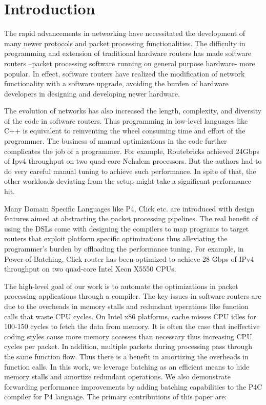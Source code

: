 \section{Introduction}

The rapid advancements in networking have necessitated the development of many newer protocols and packet processing functionalities. The difficulty in programming and extension of traditional hardware routers has made software routers --packet processing software running on general purpose hardware- more popular. In effect, software routers have realized the modification of network functionality with a software upgrade, avoiding the burden of hardware developers in designing and developing newer hardware.

The evolution of networks has also increased the length, complexity, and diversity of the code in software routers. Thus programming in low-level languages like C++ is equivalent to reinventing the wheel consuming time and effort of the programmer. The business of manual optimizations in the code further complicates the job of a programmer. For example, Routebricks achieved 24Gbps of Ipv4 throughput on two quad-core Nehalem processors. But the authors had to do very careful manual tuning to achieve such performance. In spite of that, the other workloads deviating from the setup might take a significant performance hit.

Many Domain Specific Languages like P4\cite{Bosshart:2014:PPP:2656877.2656890}, Click\cite{kohler2000click} etc. are introduced with design features aimed at abstracting the packet processing pipelines. The real benefit of using the DSLs come with designing the compilers to map programs to target routers that exploit platform specific optimizations thus alleviating the programmer's burden by offloading the performance tuning. For example, in Power of Batching\cite{Kim:2012:PBC:2349896.2349910}, Click router has been optimized to achieve 28 Gbps of IPv4 throughput on two quad-core Intel Xeon X5550 CPUs.

The high-level goal of our work is to automate the optimizations in packet processing applications through a compiler. The key issues in software routers are due to the overheads in memory stalls and redundant operations like function calls that waste CPU cycles. On Intel x86 platforms, cache misses CPU idles for 100-150 cycles to fetch the data from memory. It is often the case that ineffective coding styles cause more memory accesses than necessary thus increasing CPU cycles per packet.  In addition, multiple packets during processing pass through the same function flow. Thus there is a benefit in amortizing the overheads in function calls. In this work, we leverage batching as an efficient means to hide memory stalls and amortize redundant operations. We also demonstrate forwarding performance improvements by adding batching capabilities to the P4C compiler for P4 language. The primary contributions of this paper are:

